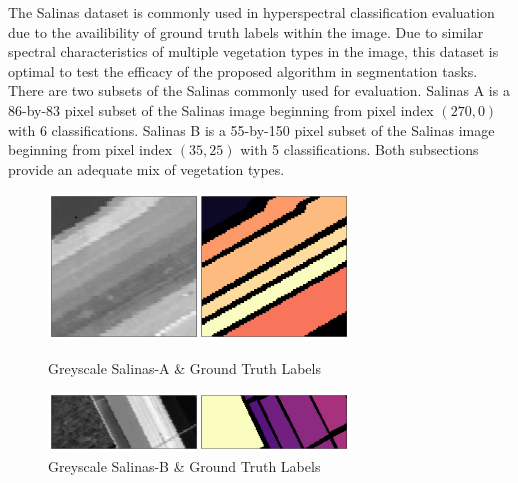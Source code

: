 The Salinas dataset is commonly used in hyperspectral classification evaluation due to the availibility of ground truth labels within the image. Due to similar spectral characteristics of multiple vegetation types in the image, this dataset is optimal to test the efficacy of the proposed algorithm in segmentation tasks. There are two subsets of the Salinas commonly used for evaluation. Salinas A is a 86-by-83 pixel subset of the Salinas image beginning from pixel index $(270, 0)$ with 6 classifications. Salinas B is a 55-by-150 pixel subset of the Salinas image beginning from pixel index $(35, 25)$ with 5 classifications. Both subsections provide an adequate mix of vegetation types.
\begin{figure}[H]
    \centering
    \includegraphics[width=8cm]{salinas-a.png}  %
    \caption{Greyscale Salinas-A \& Ground Truth Labels}
    \includegraphics[width=8cm]{salinas-b.png}  %
    \caption{Greyscale Salinas-B \& Ground Truth Labels}
    \label{salinas-ab}  %
  \end{figure}

